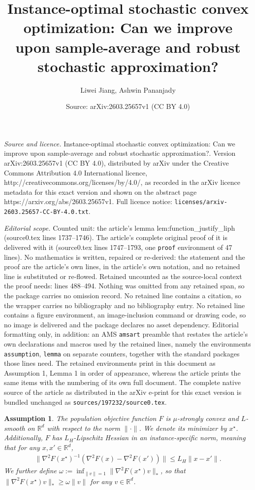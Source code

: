 \documentclass[10pt,a4paper]{amsart}
\title{Instance-optimal stochastic convex optimization: Can we improve upon sample-average and robust stochastic approximation?}
\author{Liwei Jiang, Ashwin Pananjady}
\date{Source: arXiv:2603.25657v1 (CC BY 4.0)}
\newtheorem{assumption}{Assumption}
\newcommand{\RR}{\mathbb{R}}
\newcommand{\liph}{L_H}
\newcommand{\lmin}{\omega}
\begin{document}
\maketitle

\noindent\emph{Source and licence.} Instance-optimal stochastic convex optimization: Can we improve upon sample-average and robust stochastic approximation?. Version arXiv:2603.25657v1 (CC BY 4.0), distributed by arXiv under the Creative Commons Attribution 4.0 International licence, http://creativecommons.org/licenses/by/4.0/, as recorded in the arXiv licence metadata for this exact version and shown on the abstract page https://arxiv.org/abs/2603.25657v1. Full licence notice: \texttt{licenses/arxiv-2603.25657-CC-BY-4.0.txt}.\par\smallskip

\noindent\textit{Editorial scope.} Counted unit: the article's lemma lem:function\_justify\_liph (source0.tex lines 1737--1746). The article's complete original proof of it is delivered with it (source0.tex lines 1747--1793, one \texttt{proof} environment of 47 lines). No mathematics is written, repaired or re-derived: the statement and the proof are the article's own lines, in the article's own notation, and no retained line is substituted or re-flowed.  Retained uncounted as the source-local context the proof needs: lines 488--494.  Nothing was omitted from any retained span, so the package carries no omission record.  No retained line contains a citation, so the wrapper carries no bibliography and no bibliography entry.  No retained line contains a figure environment, an image-inclusion command or drawing code, so no image is delivered and the package declares no asset dependency.  Editorial formatting only, in addition: an AMS \texttt{amsart} preamble that restates the article's own declarations and macros used by the retained lines, namely the environments \texttt{assumption}, \texttt{lemma} on separate counters, together with the standard packages those lines need.  The retained environments print in this document as Assumption 1, Lemma 1 in order of appearance, whereas the article prints the same items with the numbering of its own full document.  The complete native source of the article as distributed in the arXiv e-print for this exact version is bundled unchanged as \texttt{sources/197232/source0.tex}.
\begin{assumption}\label{assum: non-quadratic}
	The population objective function $F$ is $\mu$-strongly convex and $L$-smooth on $\mathbb{R}^d$ with respect to the norm $\| \cdot \|$. We denote its minimizer by $x^\star$. Additionally, $F$ has $\liph$-Lipschitz Hessian in an instance-specific norm, meaning that for any $x, x' \in \RR^d$,
	\begin{align}\label{eqn:lip_hessian}
		\|\nabla^2 F(x^\star) ^{-1}(\nabla^2 F(x) - \nabla^2 F(x'))\| \le \liph \|x - x'\|.
	\end{align}
	We further define $\lmin := \inf_{\|v\| =1} \| \nabla^2 F(x^\star) v \|_*$, so  that $\|\nabla^2 F(x^\star) v\|_* \ge \lmin \|v\|$ for any $v \in \RR^d$.
\end{assumption}
\end{document}
